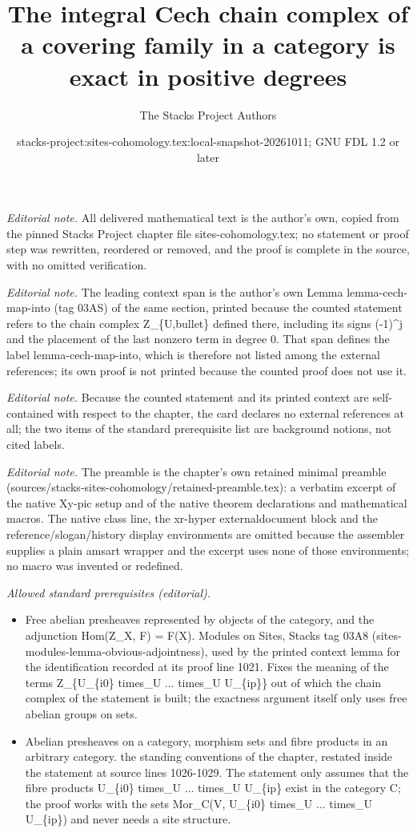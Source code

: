 \documentclass[10pt,a4paper]{amsart}
\title{The integral Cech chain complex of a covering family in a category is exact in positive degrees}
\author{The Stacks Project Authors}
\date{stacks-project:sites-cohomology.tex:local-snapshot-20261011; GNU FDL 1.2 or later}
\theoremstyle{plain}
\theoremstyle{definition}
\theoremstyle{remark}
\numberwithin{equation}{subsection}
\begin{document}
\maketitle
\noindent\textit{Editorial note.} All delivered mathematical text is the author's own, copied from the pinned Stacks Project chapter file sites-cohomology.tex; no statement or proof step was rewritten, reordered or removed, and the proof is complete in the source, with no omitted verification.\par\medskip
\noindent\textit{Editorial note.} The leading context span is the author's own Lemma lemma-cech-map-into (tag 03AS) of the same section, printed because the counted statement refers to the chain complex Z\_\{U,bullet\} defined there, including its signs (-1)\textasciicircum{}j and the placement of the last nonzero term in degree 0. That span defines the label lemma-cech-map-into, which is therefore not listed among the external references; its own proof is not printed because the counted proof does not use it.\par\medskip
\noindent\textit{Editorial note.} Because the counted statement and its printed context are self-contained with respect to the chapter, the card declares no external references at all; the two items of the standard prerequisite list are background notions, not cited labels.\par\medskip
\noindent\textit{Editorial note.} The preamble is the chapter's own retained minimal preamble (sources/stacks-sites-cohomology/retained-preamble.tex): a verbatim excerpt of the native Xy-pic setup and of the native theorem declarations and mathematical macros. The native class line, the xr-hyper externaldocument block and the reference/slogan/history display environments are omitted because the assembler supplies a plain amsart wrapper and the excerpt uses none of those environments; no macro was invented or redefined.\par\medskip
\noindent\textit{Allowed standard prerequisites (editorial).}\begin{itemize}
\item Free abelian presheaves represented by objects of the category, and the adjunction Hom(Z\_X, F) = F(X). Modules on Sites, Stacks tag 03A8 (sites-modules-lemma-obvious-adjointness), used by the printed context lemma for the identification recorded at its proof line 1021. Fixes the meaning of the terms Z\_\{U\_\{i0\} times\_U ... times\_U U\_\{ip\}\} out of which the chain complex of the statement is built; the exactness argument itself only uses free abelian groups on sets.
\item Abelian presheaves on a category, morphism sets and fibre products in an arbitrary category. the standing conventions of the chapter, restated inside the statement at source lines 1026-1029. The statement only assumes that the fibre products U\_\{i0\} times\_U ... times\_U U\_\{ip\} exist in the category C; the proof works with the sets Mor\_C(V, U\_\{i0\} times\_U ... times\_U U\_\{ip\}) and never needs a site structure.
\end{itemize}\medskip
\end{document}
